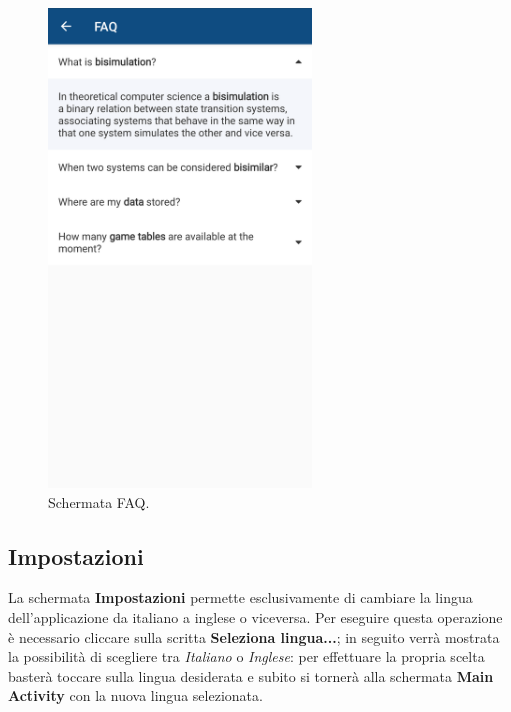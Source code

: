 \documentclass[a4paper,11pt,twoside,openright]{report}
\begin{document}
\begin{figure}[h]
\centering
\includegraphics[width=\linewidth,height=360pt,keepaspectratio]{images/FAQ.png}
\caption{Schermata FAQ.}
\end{figure}

\subsection{Impostazioni}
La schermata \textbf{Impostazioni} permette esclusivamente di cambiare la lingua dell'applicazione da italiano a inglese o viceversa. Per eseguire questa operazione è necessario 
cliccare sulla scritta \textbf{Seleziona lingua...}; in seguito verrà mostrata la possibilità di scegliere tra \textit{Italiano} o \textit{Inglese}: per effettuare la propria scelta basterà toccare
sulla lingua desiderata e subito si tornerà alla schermata \textbf{Main Activity} con la nuova lingua selezionata.
\end{document}
